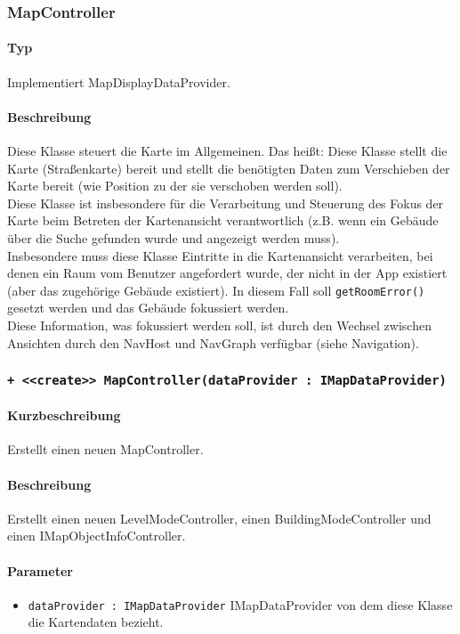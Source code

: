 \subsubsection{MapController}
\paragraph*{Typ}
Implementiert MapDisplayDataProvider.
\paragraph*{Beschreibung}
Diese Klasse steuert die Karte im Allgemeinen. Das heißt: Diese Klasse stellt die Karte (Straßenkarte) bereit 
und stellt die benötigten Daten zum Verschieben der Karte bereit (wie Position zu der sie verschoben werden soll).\\
Diese Klasse ist insbesondere für die Verarbeitung und Steuerung des Fokus der Karte beim Betreten der 
Kartenansicht verantwortlich (z.B. wenn ein Gebäude über die Suche gefunden wurde und angezeigt werden muss).\\
Insbesondere muss diese Klasse Eintritte in die Kartenansicht verarbeiten, bei denen ein Raum vom Benutzer angefordert wurde, 
der nicht in der App existiert (aber das zugehörige Gebäude existiert). In diesem Fall soll \texttt{getRoomError()} gesetzt 
werden und das Gebäude fokussiert werden.\\
Diese Information, was fokussiert werden soll, ist durch den Wechsel zwischen Ansichten durch den NavHost und NavGraph verfügbar (siehe Navigation).

\subsubsection*{\texttt{+ <<create>> MapController(dataProvider : IMapDataProvider)}}%
\paragraph*{Kurzbeschreibung}
Erstellt einen neuen MapController.
\paragraph*{Beschreibung}
Erstellt einen neuen LevelModeController, einen BuildingModeController und einen IMapObjectInfoController.
\paragraph*{Parameter}
\begin{itemize}
    \item \texttt{dataProvider : IMapDataProvider} IMapDataProvider von dem diese Klasse die Kartendaten bezieht.
\end{itemize}
